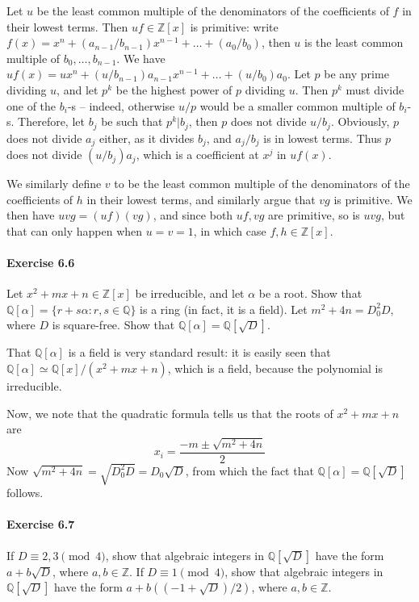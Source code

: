 \documentclass[notitlepage]{article}
\theoremstyle{definition}
\newcommand\Q{\mathbb{Q}}
\newcommand\Z{\mathbb{Z}}
\begin{document}
Let $u$ be the least common multiple of the denominators of the
coefficients of $f$ in their lowest terms. Then $uf \in \Z[x]$ is
primitive: write $f(x) = x^n + (a_{n-1}/b_{n-1}) x^{n-1} + \ldots +
(a_0/b_0)$, then $u$ is the least common multiple of $b_0, \ldots,
b_{n-1}$. We have $uf(x) = u x^n + (u/b_{n-1}) a_{n-1} x^{n-1} +
\ldots + (u/b_0) a_0$. Let $p$ be any prime dividing $u$, and let
$p^k$ be the highest power of $p$ dividing $u$. Then $p^k$ must divide
one of the $b_i$-s -- indeed, otherwise $u/p$ would be a smaller
common multiple of $b_i$-s. Therefore, let $b_j$ be such that $p^k |
b_j$, then $p$ does not divide $u/b_j$. Obviously, $p$ does not divide
$a_j$ either, as it divides $b_j$, and $a_j/b_j$ is in lowest
terms. Thus $p$ does not divide $(u/b_j)a_j$, which is a coefficient
at $x^j$ in $uf(x)$.

We similarly define $v$ to be the least common multiple of the
denominators of the coefficients of $h$ in their lowest terms, and
similarly argue that $vg$ is primitive. We then have $uvg = (uf)(vg)$,
and since both $uf, vg$ are primitive, so is $uvg$, but that can only
happen when $u = v = 1$, in which case $f, h \in \Z[x]$.

\paragraph{Exercise 6.6}
Let $x^2 + mx + n \in \Z[x]$ be irreducible, and let $\alpha$ be a
root. Show that $\Q[\alpha] = \{r +s\alpha: r, s \in \Q\}$ is a ring
(in fact, it is a field). Let $m^2 + 4n = D_0^2 D$, where $D$ is
square-free. Show that $\Q[\alpha] = \Q[\sqrt{D}]$.

That $\Q[\alpha]$ is a field is very standard result: it is easily
seen that $\Q[\alpha] \simeq \Q[x]/(x^2 + mx + n)$, which is a field,
because the polynomial is irreducible.

Now, we note that the quadratic formula tells us that the roots of
$x^2 + mx + n$ are
\begin{equation}
  x_i = \frac{-m \pm \sqrt{m^2 + 4n}}{2}
\end{equation}
Now $\sqrt{m^2 + 4n} = \sqrt{D_0^2D} = D_0 \sqrt{D}$, from which the
fact that $\Q[\alpha] = \Q[\sqrt{D}]$ follows.

\paragraph{Exercise 6.7}
If $D \equiv 2, 3  \pmod 4$, show that algebraic integers in $\Q[\sqrt{D}]$
have the form $a + b \sqrt{D}$, where $a, b \in \Z$. If
$D \equiv 1  \pmod 4$, show that algebraic integers in $\Q[\sqrt{D}]$ have
the form $a + b((-1 + \sqrt{D})/2)$, where $a, b \in \Z$.
\end{document}
